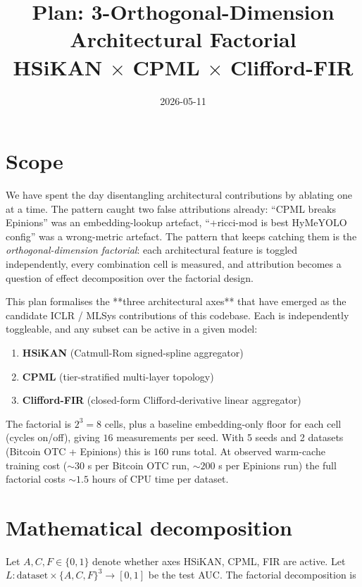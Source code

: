 \documentclass[11pt]{article}
\title{Plan: 3-Orthogonal-Dimension Architectural Factorial\\
  HSiKAN $\times$ CPML $\times$ Clifford-FIR}
\author{}
\date{2026-05-11}
\begin{document}
\maketitle

\section{Scope}

We have spent the day disentangling architectural contributions by
ablating one at a time. The pattern caught two false attributions
already: ``CPML breaks Epinions'' was an embedding-lookup artefact,
``+ricci-mod is best HyMeYOLO config'' was a wrong-metric
artefact. The pattern that keeps catching them is the
\emph{orthogonal-dimension factorial}: each architectural feature
is toggled independently, every combination cell is measured, and
attribution becomes a question of effect decomposition over the
factorial design.

This plan formalises the **three architectural axes** that have
emerged as the candidate ICLR / MLSys contributions of this
codebase. Each is independently toggleable, and any subset can be
active in a given model:

\begin{enumerate}
  \item \textbf{HSiKAN} (Catmull-Rom signed-spline aggregator)
  \item \textbf{CPML} (tier-stratified multi-layer topology)
  \item \textbf{Clifford-FIR} (closed-form Clifford-derivative
    linear aggregator)
\end{enumerate}

The factorial is $2^3 = 8$ cells, plus a baseline embedding-only
floor for each cell (cycles on/off), giving $16$ measurements per
seed. With 5 seeds and 2 datasets (Bitcoin OTC + Epinions) this is
$160$ runs total. At observed warm-cache training cost ($\sim 30$ s
per Bitcoin OTC run, $\sim 200$ s per Epinions run) the full
factorial costs $\sim 1.5$ hours of CPU time per dataset.

\section{Mathematical decomposition}

Let $A, C, F \in \{0, 1\}$ denote whether axes HSiKAN, CPML, FIR
are active. Let $L : \text{dataset} \times \{A, C, F\}^3 \to [0, 1]$
be the test AUC. The factorial decomposition is
\end{document}
